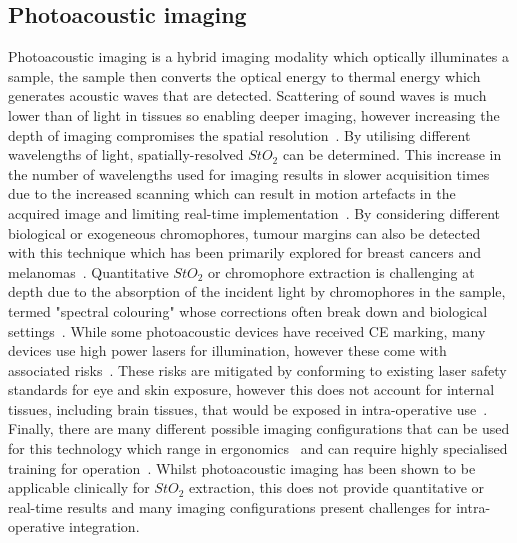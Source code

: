 \subsection{Photoacoustic imaging}
Photoacoustic imaging is a hybrid imaging modality which optically illuminates a sample, the sample then converts the optical energy to thermal energy which generates acoustic waves that are detected. Scattering of sound waves is much lower than of light in tissues so enabling deeper imaging, however increasing the depth of imaging compromises the spatial resolution~\cite{Assi2023}. By utilising different wavelengths of light, spatially-resolved $StO_2$ can be determined. This increase in the number of wavelengths used for imaging results in slower acquisition times due to the increased scanning which can result in motion artefacts in the acquired image and limiting real-time implementation~\cite{Assi2023, Attia2019}. By considering different biological or exogeneous chromophores, tumour margins can also be detected with this technique which has been primarily explored for breast cancers and melanomas~\cite{Assi2023, Attia2019, Taylor-Williams2022}. Quantitative $StO_2$ or chromophore extraction is challenging at depth due to the absorption of the incident light by chromophores in the sample, termed "spectral colouring" whose corrections often break down and biological settings~\cite{Assi2023, Taylor-Williams2022}. While some photoacoustic devices have received CE marking, many devices use high power lasers for illumination, however these come with associated risks~\cite{Assi2023}. These risks are mitigated by conforming to existing laser safety standards for eye and skin exposure, however this does not account for internal tissues, including brain tissues, that would be exposed in intra-operative use~\cite{Assi2023}. Finally, there are many different possible imaging configurations that can be used for this technology which range in ergonomics~\cite{Attia2019} and can require highly specialised training for operation~\cite{Assi2023}. Whilst photoacoustic imaging has been shown to be applicable clinically for $StO_2$ extraction, this does not provide quantitative or real-time results and many imaging configurations present challenges for intra-operative integration. 

